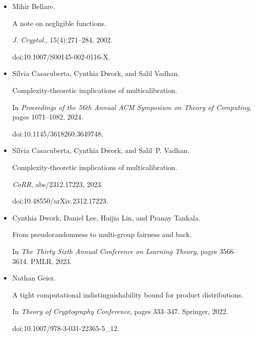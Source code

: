 \documentclass[10pt,a4paper]{article}
\begin{document}
\begin{itemize}


\item[] 
[1]

Mihir Bellare.


A note on negligible functions.


\emph{J. Cryptol.}, 15(4):271–284, 2002.


doi:10.1007/S00145-002-0116-X.





\item[] 
[2]

Sílvia Casacuberta, Cynthia Dwork, and Salil Vadhan.


Complexity-theoretic implications of multicalibration.


In \emph{Proceedings of the 56th Annual ACM Symposium on Theory of
Computing}, pages 1071–1082, 2024.


doi:10.1145/3618260.3649748.





\item[] 
[3]

Sílvia Casacuberta, Cynthia Dwork, and Salil P. Vadhan.


Complexity-theoretic implications of multicalibration.


\emph{CoRR}, abs/2312.17223, 2023.


doi:10.48550/arXiv.2312.17223.





\item[] 
[4]

Cynthia Dwork, Daniel Lee, Huijia Lin, and Pranay Tankala.


From pseudorandomness to multi-group fairness and back.


In \emph{The Thirty Sixth Annual Conference on Learning Theory}, pages
3566–3614. PMLR, 2023.





\item[] 
[5]

Nathan Geier.


A tight computational indistinguishability bound for product
distributions.


In \emph{Theory of Cryptography Conference}, pages 333–347. Springer,
2022.


doi:10.1007/978-3-031-22365-5\_12.






\end{itemize}
\end{document}
